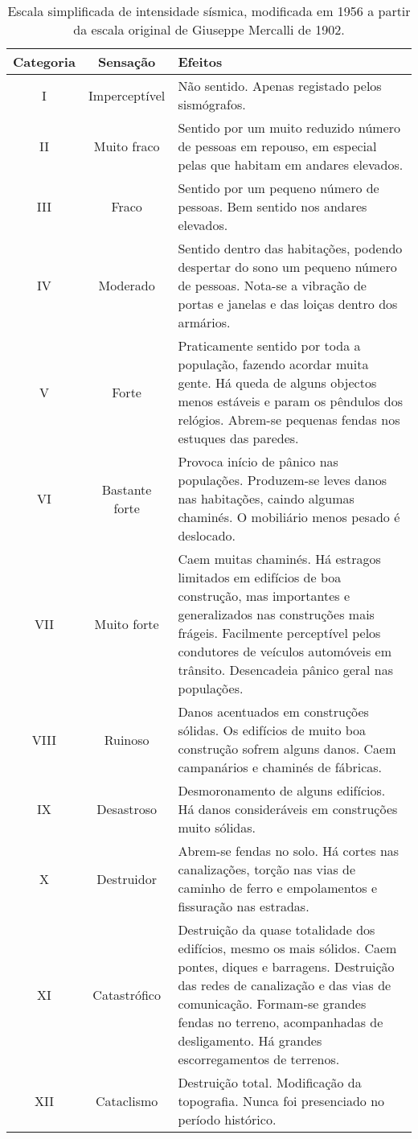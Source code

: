 \begin{table}[H]
\begin{center}
\begin{scriptsize}
\noindent\begin{tabular}{c|c|p{12cm}}
\hline
Categoria  	& Sensação & Efeitos \\
\hline
I 			&	Imperceptível 	&	Não sentido. Apenas registado pelos sismógrafos.
\\II 		&	Muito fraco 	&	Sentido por um muito reduzido número de pessoas em 
								repouso, em especial pelas que habitam em andares
								elevados.
\\III 		&	Fraco 			&	Sentido por um pequeno número de pessoas. Bem sentido nos andares elevados.
\\IV 		&	Moderado 		&	Sentido dentro das habitações, podendo despertar do sono um pequeno número de pessoas. 
								Nota-se a vibração de
								portas e janelas e das loiças dentro dos armários.
\\V 		&	Forte 			&	Praticamente sentido por toda a população, fazendo acordar muita gente. 
								Há queda de alguns objectos menos estáveis e param os pêndulos dos relógios. 
								Abrem-se pequenas fendas nos estuques das paredes.
\\VI 		&	Bastante forte 	&	Provoca início de pânico nas populações. Produzem-se leves danos nas habitações, 
								caindo algumas chaminés. O mobiliário menos pesado é deslocado.
\\VII 		&	Muito forte 	&	Caem muitas chaminés. Há estragos limitados em edifícios de boa construção, 
								mas importantes e generalizados nas construções mais frágeis. 
								Facilmente perceptível pelos condutores de veículos automóveis em trânsito. 
								Desencadeia pânico geral nas populações.
\\VIII 		&	Ruinoso  		&	Danos acentuados em construções sólidas. Os edifícios de muito boa construção 
								sofrem alguns danos. Caem campanários e chaminés de fábricas.
\\IX 		&	Desastroso 		&	Desmoronamento de alguns edifícios. Há danos consideráveis em construções muito sólidas.
\\X 		&	Destruidor 		&	Abrem-se fendas no solo. Há cortes nas canalizações, torção nas vias de caminho 
								de ferro e empolamentos e fissuração nas estradas.
\\XI 		&	Catastrófico 	&	Destruição da quase totalidade dos edifícios, mesmo os mais sólidos. 
								Caem pontes, diques e barragens. Destruição das redes de canalização e das vias de comunicação. 
								Formam-se grandes fendas no terreno, acompanhadas de desligamento. Há grandes escorregamentos de terrenos.
\\XII 		&	Cataclismo 		&	Destruição total. Modificação da topografia. Nunca foi presenciado no período histórico. \\
\hline
\end{tabular}
\caption{Escala simplificada de intensidade sísmica, 
modificada em 1956 a partir da escala original de Giuseppe Mercalli
de 1902.}
\label{tab:mercalli}
\end{scriptsize}
\end{center}
\end{table}


